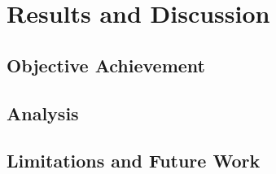 \section{Results and Discussion}
\label{sec:results}

\subsection{Objective Achievement}

\subsection{Analysis}

\subsection{Limitations and Future Work}
